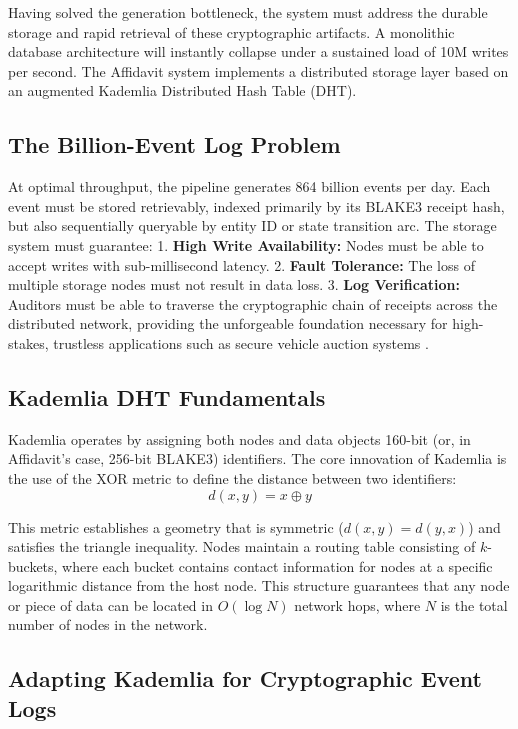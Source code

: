 Having solved the generation bottleneck, the system must address the durable storage and rapid retrieval of these cryptographic artifacts. A monolithic database architecture will instantly collapse under a sustained load of 10M writes per second. The Affidavit system implements a distributed storage layer based on an augmented Kademlia Distributed Hash Table (DHT).

\subsection{The Billion-Event Log Problem}

At optimal throughput, the pipeline generates 864 billion events per day. Each event must be stored retrievably, indexed primarily by its BLAKE3 receipt hash, but also sequentially queryable by entity ID or state transition arc. The storage system must guarantee:
1. \textbf{High Write Availability:} Nodes must be able to accept writes with sub-millisecond latency.
2. \textbf{Fault Tolerance:} The loss of multiple storage nodes must not result in data loss.
3. \textbf{Log Verification:} Auditors must be able to traverse the cryptographic chain of receipts across the distributed network, providing the unforgeable foundation necessary for high-stakes, trustless applications such as secure vehicle auction systems \cite{ref_BlockchainBased33}.

\subsection{Kademlia DHT Fundamentals}

Kademlia operates by assigning both nodes and data objects 160-bit (or, in Affidavit's case, 256-bit BLAKE3) identifiers. The core innovation of Kademlia is the use of the XOR metric to define the distance between two identifiers:
$$d(x, y) = x \oplus y$$

This metric establishes a geometry that is symmetric ($d(x, y) = d(y, x)$) and satisfies the triangle inequality. Nodes maintain a routing table consisting of $k$-buckets, where each bucket contains contact information for nodes at a specific logarithmic distance from the host node. This structure guarantees that any node or piece of data can be located in $O(\log N)$ network hops, where $N$ is the total number of nodes in the network.

\subsection{Adapting Kademlia for Cryptographic Event Logs}

